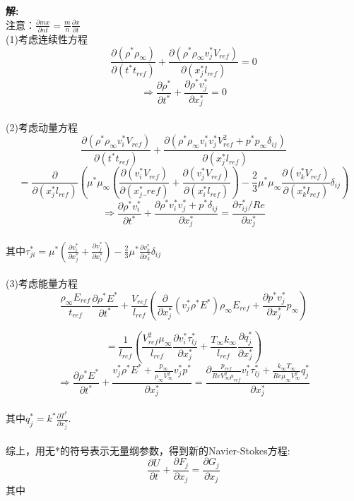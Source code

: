 \documentclass[a4paper,11pt,UTF8]{article}%
\theoremstyle{plain}
\begin{document}
   	
	\clearpage
	\noindent \textbf{解:}\\
	注意：$\frac{\partial m x}{\partial n t}=\frac{m}{n}\frac{\partial x}{\partial t}$\\
	(1)考虑连续性方程\\
$$\frac{\partial \left(\rho^*\rho_{\infty}\right)}{\partial \left(t^*t_{ref}\right)}+\frac{\partial \left(\rho^*\rho_{\infty}v_j^*V_{ref}\right)}{\partial \left(x^*_j l_{ref}\right)}=0$$
$$\Rightarrow\frac{\partial \rho^*}{\partial t^*}+\frac{\partial \rho^*v_j^*}{\partial x_j^*}=0$$
	~\\
	(2)考虑动量方程\\
	$$\frac{\partial \left(\rho^*\rho_{\infty}v^*_iV_{ref}\right)}{\partial \left(t^*t_{ref}\right)}+\frac{\partial\left(\rho^*\rho_{\infty}v_i^*v_j^*V_{ref}^2+p^*p_{\infty}\delta_{ij}\right)}{\partial \left(x_j^* l_{ref}\right)}$$$$=\frac{\partial }{\partial \left(x_j^*l_{ref}\right)}\left(\mu^*\mu_{\infty}\left(\frac{\partial\left(v_i^*V_{ref}\right)}{\partial\left(x^*_j\_{ref}\right)}+\frac{\partial\left(v_j^*V_{ref}\right)}{\partial \left(x^*_i l_{ref}\right)}\right)-\frac{2}{3}\mu^*\mu_{\infty}\frac{\partial \left(v_k^*V_{ref}\right)}{\partial\left(x^*_k l_{ref}\right)}\delta_{ij}\right)$$
	$$\Rightarrow \frac{\partial \rho^*v_i^*}{\partial t^*}+\frac{\partial \rho^*v_i^*v_j^*+p^*\delta_{ij}}{\partial x_j^*}=\frac{\partial \tau_{ij}^*/Re}{\partial x_j^*}$$\\
	其中$\tau^*_{ji}=\mu^*\left(\frac{\partial v_i^*}{\partial x^*_j}+\frac{\partial v_j^*}{\partial x^*_i}\right)-\frac{2}{3}\mu^*\frac{\partial v_k^*}{\partial x_k^*}\delta_{ij}$\\
	~\\
	(3)考虑能量方程\\
$$\frac{\rho_{\infty}E_{ref}}{t_{ref}}\frac{\partial \rho^*E^*}{\partial t^*}+\frac{V_{ref}}{l_{ref}}\left(\frac{\partial}{\partial   x_j^*}\left(v_j^*\rho^*E^*\right)\rho_{\infty}E_{ref}+\frac{\partial p^*v_j^*}{\partial x_j^*}p_{\infty}\right)$$

$$=\frac{1}{l_{ref}}\left(\frac{V_{ref}^2\mu_{\infty}}{l_{ref}}\frac{\partial v_i^*\tau_{lj}^*}{\partial  x_j^*}+\frac{T_{\infty}k_{\infty}}{l_{ref}}\frac{\partial q_j^*}{\partial x_j^*}\right)$$
$$\Rightarrow \frac{\partial \rho^*E^*}{\partial t^*}+\frac{v_j^*\rho^*E^*+\frac{p_{\infty}}{\rho_{\infty}V_{\infty}^2}v_j^*p^*}{\partial x_j^*}=\frac{\partial \frac{p_{ref}}{Re V_{\infty}^2\rho_{ref}}v_l^*\tau_{lj}^*+\frac{k_{\infty}T_{\infty}}{Re \mu_{\infty}V_{\infty}^2}q_j^*}{\partial x_j^*}$$\\
其中$q_j^*=k^*\frac{\partial T^*}{\partial x_j^*}$.\\
~\\
综上，用无*的符号表示无量纲参数，得到新的Navier-Stokes方程:\\
   $$\frac{\partial U}{\partial t}+\frac{\partial F_j}{\partial x_j}=\frac{\partial G_j}{\partial x_j}$$
其中\\
\end{document}
